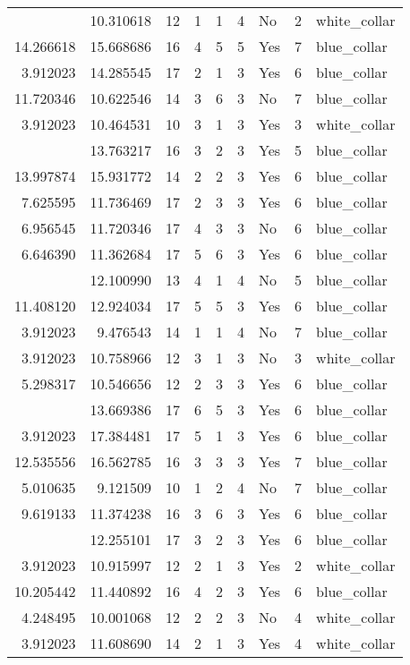 \documentclass[
]{article}
\begin{document}
\begin{longtable}[t]{rrrrrllrl}
\addlinespace
3.912023 & 10.310618 & 12 & 1 & 1 & 4 & No & 2 & white\_collar\\
14.266618 & 15.668686 & 16 & 4 & 5 & 5 & Yes & 7 & blue\_collar\\
3.912023 & 14.285545 & 17 & 2 & 1 & 3 & Yes & 6 & blue\_collar\\
11.720346 & 10.622546 & 14 & 3 & 6 & 3 & No & 7 & blue\_collar\\
3.912023 & 10.464531 & 10 & 3 & 1 & 3 & Yes & 3 & white\_collar\\
\addlinespace
11.635585 & 13.763217 & 16 & 3 & 2 & 3 & Yes & 5 & blue\_collar\\
13.997874 & 15.931772 & 14 & 2 & 2 & 3 & Yes & 6 & blue\_collar\\
7.625595 & 11.736469 & 17 & 2 & 3 & 3 & Yes & 6 & blue\_collar\\
6.956545 & 11.720346 & 17 & 4 & 3 & 3 & No & 6 & blue\_collar\\
6.646390 & 11.362684 & 17 & 5 & 6 & 3 & Yes & 6 & blue\_collar\\
\addlinespace
3.912023 & 12.100990 & 13 & 4 & 1 & 4 & No & 5 & blue\_collar\\
11.408120 & 12.924034 & 17 & 5 & 5 & 3 & Yes & 6 & blue\_collar\\
3.912023 & 9.476543 & 14 & 1 & 1 & 4 & No & 7 & blue\_collar\\
3.912023 & 10.758966 & 12 & 3 & 1 & 3 & No & 3 & white\_collar\\
5.298317 & 10.546656 & 12 & 2 & 3 & 3 & Yes & 6 & blue\_collar\\
\addlinespace
10.310618 & 13.669386 & 17 & 6 & 5 & 3 & Yes & 6 & blue\_collar\\
3.912023 & 17.384481 & 17 & 5 & 1 & 3 & Yes & 6 & blue\_collar\\
12.535556 & 16.562785 & 16 & 3 & 3 & 3 & Yes & 7 & blue\_collar\\
5.010635 & 9.121509 & 10 & 1 & 2 & 4 & No & 7 & blue\_collar\\
9.619133 & 11.374238 & 16 & 3 & 6 & 3 & Yes & 6 & blue\_collar\\
\addlinespace
7.803843 & 12.255101 & 17 & 3 & 2 & 3 & Yes & 6 & blue\_collar\\
3.912023 & 10.915997 & 12 & 2 & 1 & 3 & Yes & 2 & white\_collar\\
10.205442 & 11.440892 & 16 & 4 & 2 & 3 & Yes & 6 & blue\_collar\\
4.248495 & 10.001068 & 12 & 2 & 2 & 3 & No & 4 & white\_collar\\
3.912023 & 11.608690 & 14 & 2 & 1 & 3 & Yes & 4 & white\_collar\\

\end{longtable}
\end{document}
